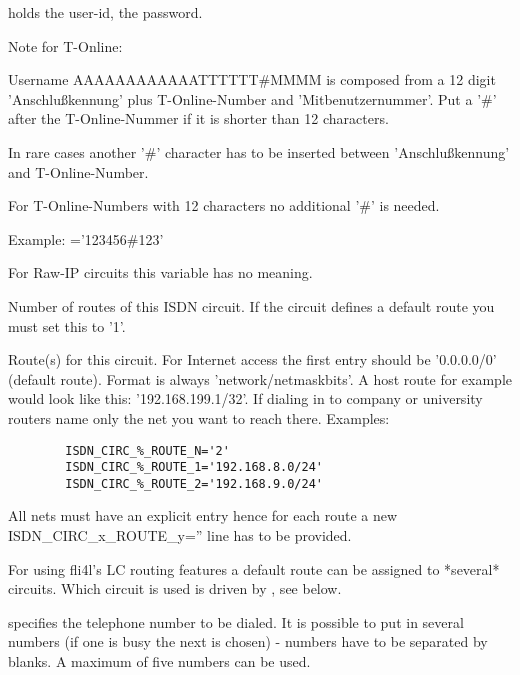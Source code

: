 \begin{description}
   holds the user-id, 
  the password.
  
  Note for T-Online:
  
  Username AAAAAAAAAAAATTTTTT\#MMMM is composed from a 12 digit 'Anschlußkennung'
  plus T-Online-Number and 'Mitbenutzernummer'. Put a '\#' after the T-Online-Nummer 
  if it is shorter than 12 characters.
  
  In rare cases another '\#' character has to be inserted between 'Anschlußkennung' and 
  T-Online-Number.
  
  For T-Online-Numbers with 12 characters no additional '\#' is needed.
  
  Example:  ='123456\#123'

  
  For Raw-IP circuits this variable has no meaning.


  Number of routes of this ISDN circuit. If the circuit defines a default 
  route you must set this to '1'.

  
  Route(s) for this circuit. For Internet access the first entry should be 
  '0.0.0.0/0' (default route). Format is always 'network/netmaskbits'. A 
  host route for example would look like this: '192.168.199.1/32'. If dialing 
  in to company or university routers name only the net you want to reach there. 
  Examples:

\begin{example}
\begin{verbatim}
        ISDN_CIRC_%_ROUTE_N='2'
        ISDN_CIRC_%_ROUTE_1='192.168.8.0/24'
        ISDN_CIRC_%_ROUTE_2='192.168.9.0/24'
\end{verbatim}
\end{example}
  
  All nets must have an explicit entry hence for each route a new 
  ISDN\_CIRC\_x\_ROUTE\_y='' line has to be provided.
  
  For using fli4l's LC routing features a default route can be assigned to 
  *several* circuits. Which circuit is used is driven by , 
  see below.


   specifies the telephone number to be dialed. It is 
  possible to put in several numbers (if one is busy the next is chosen) - numbers have 
  to be separated by blanks. A maximum of five numbers can be used.


\end{description}
